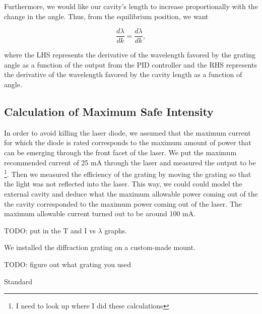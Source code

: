 Furthermore, we would like our cavity's length to increase proportionally with the change in the angle. Thus, from the equilibrium position, we want 

\begin{equation}
\frac{d \lambda}{d k} = \frac{d \lambda}{d k},
\end{equation}

where the LHS represents the derivative of the wavelength favored by the grating angle as a function of the output from the PID controller and the RHS represents the derivative of the wavelength favored by the cavity length as a function of angle. 



\subsection{Calculation of Maximum Safe Intensity}
In order to avoid killing the laser diode, we assumed that the maximum current for which the diode is rated corresponds to the maximum amount of power that can be emerging through the front facet of the laser. We put the maximum recommended current of 25 mA through the laser and measured the output to be \footnote{I need to look up where I did these calculations}. Then we measured the efficiency of the grating by moving the grating so that the light was not reflected into the laser. This way, we could could model the external cavity and deduce what the maximum allowable power coming out of the the cavity corresponded to the maximum power coming out of the laser. The maximum allowable current turned out to be around 100 mA. 

 
TODO: put in the T and I vs $\lambda$ graphs. 

We installed the diffraction grating on a custom-made mount. 

TODO: figure out what grating you used 

Standard 


